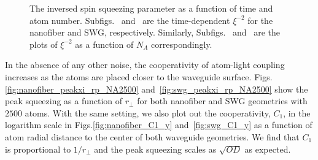 \documentclass[preprint,aps,pra,onecolumn,superscriptaddress]{revtex4-1} %
\begin{document}
\begin{figure}[htb]
\centering
 \begin{minipage}[h]{0.95\linewidth}
    \hfill
   \end{minipage}\vfill
   \begin{minipage}[h]{0.95\linewidth}
       \hfill
   \end{minipage}
\caption{The inversed spin squeezing parameter as a function of time and atom number. Subfigs.~\protect{} and~\protect{} are the time-dependent $ \xi^{-2} $ for the nanofiber and SWG, respectively. Similarly, Subfigs.~\protect{} and~\protect{} are the plots of $ \xi^{-2} $ as a function of $ N_A $ correspondingly. }\label{fig:xi_rpfix_NA_t}
\end{figure}

{\color{red} In the absence of any other noise, the cooperativity of atom-light coupling increases as the atoms are placed closer to the waveguide surface. Figs.\ref{fig:nanofiber_peakxi_rp_NA2500} and~\ref{fig:swg_peakxi_rp_NA2500} show the peak squeezing  as a function of $ r\!_\perp $ for both nanofiber and SWG geometries with $2500$ atoms. With the same setting, we also plot out the cooperativity, $ C_1 $, in the logarithm scale in Figs.\ref{fig:nanofiber_C1_y} and~\ref{fig:swg_C1_y} as a function of atom radial distance to the center of both waveguide geometries. We find that $C_1$ is proportional to $ 1/r\!_\perp $ and the peak squeezing scales as $ \sqrt{OD} $ as expected. }
\end{document}
